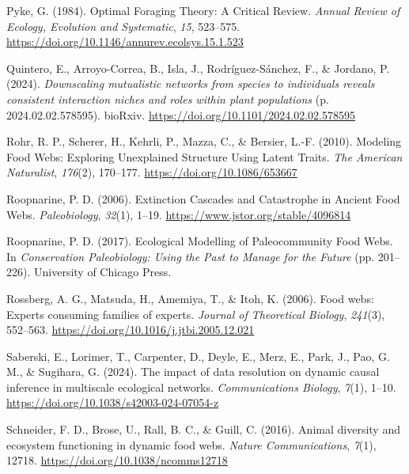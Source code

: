\documentclass[
]{article}
\newlength{\cslhangindent}
\newenvironment{CSLReferences}[2] %
 {\begin{list}{}{%
  \setlength{\itemindent}{0pt}
  \setlength{\leftmargin}{0pt}
  \setlength{\parsep}{0pt}
  \ifodd #1
   \setlength{\leftmargin}{\cslhangindent}
   \setlength{\itemindent}{-1\cslhangindent}
  \fi
  \setlength{\itemsep}{#2\baselineskip}}}
 {\end{list}}
\begin{document}
\begin{CSLReferences}{1}{0}
Pyke, G. (1984). Optimal {Foraging Theory}: {A Critical Review}.
\emph{Annual Review of Ecology, Evolution and Systematic}, \emph{15},
523--575. \url{https://doi.org/10.1146/annurev.ecolsys.15.1.523}

Quintero, E., Arroyo-Correa, B., Isla, J., Rodríguez-Sánchez, F., \&
Jordano, P. (2024). \emph{Downscaling mutualistic networks from species
to individuals reveals consistent interaction niches and roles within
plant populations} (p. 2024.02.02.578595). bioRxiv.
\url{https://doi.org/10.1101/2024.02.02.578595}

Rohr, R. P., Scherer, H., Kehrli, P., Mazza, C., \& Bersier, L.-F.
(2010). Modeling {Food Webs}: {Exploring Unexplained Structure Using
Latent Traits}. \emph{The American Naturalist}, \emph{176}(2), 170--177.
\url{https://doi.org/10.1086/653667}

Roopnarine, P. D. (2006). Extinction {Cascades} and {Catastrophe} in
{Ancient Food Webs}. \emph{Paleobiology}, \emph{32}(1), 1--19.
\url{https://www.jstor.org/stable/4096814}

Roopnarine, P. D. (2017). Ecological {Modelling} of {Paleocommunity Food
Webs}. In \emph{Conservation {Paleobiology}: {Using} the {Past} to
{Manage} for the {Future}} (pp. 201--226). University of Chicago Press.

Rossberg, A. G., Matsuda, H., Amemiya, T., \& Itoh, K. (2006). Food
webs: {Experts} consuming families of experts. \emph{Journal of
Theoretical Biology}, \emph{241}(3), 552--563.
\url{https://doi.org/10.1016/j.jtbi.2005.12.021}

Saberski, E., Lorimer, T., Carpenter, D., Deyle, E., Merz, E., Park, J.,
Pao, G. M., \& Sugihara, G. (2024). The impact of data resolution on
dynamic causal inference in multiscale ecological networks.
\emph{Communications Biology}, \emph{7}(1), 1--10.
\url{https://doi.org/10.1038/s42003-024-07054-z}

Schneider, F. D., Brose, U., Rall, B. C., \& Guill, C. (2016). Animal
diversity and ecosystem functioning in dynamic food webs. \emph{Nature
Communications}, \emph{7}(1), 12718.
\url{https://doi.org/10.1038/ncomms12718}


\end{CSLReferences}
\end{document}
